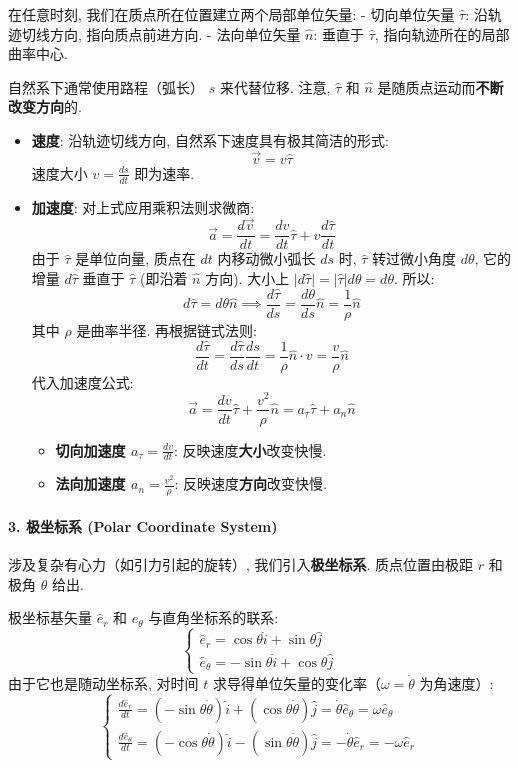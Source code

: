 \documentclass[
  a4paper,
]{ctexrep}
\providecommand{\tightlist}{%
  \setlength{\itemsep}{0pt}\setlength{\parskip}{0pt}}
\begin{document}
在任意时刻, 我们在质点所在位置建立两个局部单位矢量: - 切向单位矢量
\(\hat{\tau}\): 沿轨迹切线方向, 指向质点前进方向. - 法向单位矢量
\(\hat{n}\): 垂直于 \(\hat{\tau}\), 指向轨迹所在的局部曲率中心.

自然系下通常使用路程（弧长） \(s\) 来代替位移. 注意, \(\hat{\tau}\) 和
\(\hat{n}\) 是随质点运动而\textbf{不断改变方向}的.

\begin{itemize}
\item
  \textbf{速度}: 沿轨迹切线方向, 自然系下速度具有极其简洁的形式:
  \[\vec{v} = v\hat{\tau}\] 速度大小 \(v = \frac{ds}{dt}\) 即为速率.
\item
  \textbf{加速度}: 对上式应用乘积法则求微商:
  \[\vec{a} = \frac{d\vec{v}}{dt} = \frac{dv}{dt}\hat{\tau} + v\frac{d\hat{\tau}}{dt}\]
  由于 \(\hat{\tau}\) 是单位向量, 质点在 \(dt\) 内移动微小弧长 \(ds\)
  时, \(\hat{\tau}\) 转过微小角度 \(d\theta\), 它的增量 \(d\hat{\tau}\)
  垂直于 \(\hat{\tau}\) (即沿着 \(\hat{n}\) 方向). 大小上
  \(|d\hat{\tau}| = |\hat{\tau}|d\theta = d\theta\). 所以:
  \[d\hat{\tau} = d\theta \hat{n} \implies \frac{d\hat{\tau}}{ds} = \frac{d\theta}{ds} \hat{n} = \frac{1}{\rho}\hat{n}\]
  其中 \(\rho\) 是曲率半径. 再根据链式法则:
  \[\frac{d\hat{\tau}}{dt} = \frac{d\hat{\tau}}{ds} \frac{ds}{dt} = \frac{1}{\rho}\hat{n} \cdot v = \frac{v}{\rho}\hat{n}\]
  代入加速度公式:
  \[\vec{a} = \frac{dv}{dt}\hat{\tau} + \frac{v^2}{\rho}\hat{n} = a_\tau \hat{\tau} + a_n \hat{n}\]

  \begin{itemize}
  \tightlist
  \item
    \textbf{切向加速度 \(a_\tau = \frac{dv}{dt}\)}:
    反映速度\textbf{大小}改变快慢.
  \item
    \textbf{法向加速度 \(a_n = \frac{v^2}{\rho}\)}:
    反映速度\textbf{方向}改变快慢.
  \end{itemize}
\end{itemize}

\paragraph{3. 极坐标系 (Polar Coordinate
System)}\label{ux6781ux5750ux6807ux7cfb-polar-coordinate-system}

涉及复杂有心力（如引力引起的旋转）, 我们引入\textbf{极坐标系}.
质点位置由极距 \(r\) 和极角 \(\theta\) 给出.

极坐标基矢量 \(\hat{e}_r\) 和 \(\hat{e}_\theta\) 与直角坐标系的联系: \[
\begin{cases}
\hat{e}_r = \cos\theta \hat{i} + \sin\theta \hat{j} \\
\hat{e}_\theta = -\sin\theta \hat{i} + \cos\theta \hat{j}
\end{cases}
\] 由于它也是随动坐标系, 对时间 \(t\)
求导得单位矢量的变化率（\(\omega = \dot{\theta}\) 为角速度）: \[
\begin{cases}
\frac{d\hat{e}_r}{dt} = (-\sin\theta \dot{\theta})\hat{i} + (\cos\theta \dot{\theta})\hat{j} = \dot{\theta} \hat{e}_\theta = \omega \hat{e}_\theta \\
\frac{d\hat{e}_\theta}{dt} = (-\cos\theta \dot{\theta})\hat{i} - (\sin\theta \dot{\theta})\hat{j} = -\dot{\theta} \hat{e}_r = -\omega \hat{e}_r
\end{cases}
\]
\end{document}
